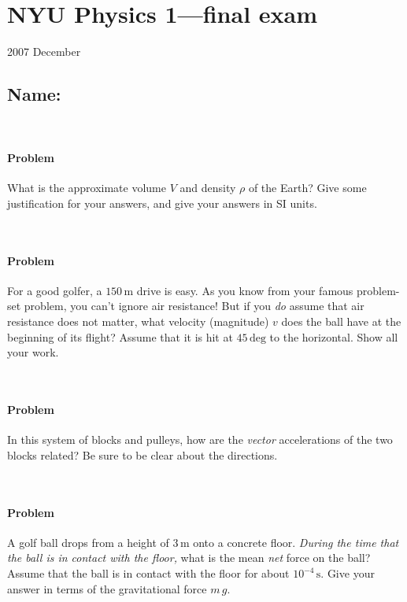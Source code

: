 \documentclass[12pt,letterpaper]{article}
\newcommand{\m}{\mathrm{m}}
\newcommand{\s}{\mathrm{s}}
\renewcommand{\deg}{\mathrm{deg}}
\newcounter{problem}
\begin{document}
\section*{NYU Physics 1---final exam}

2007 December

\subsection*{Name:}

~ \vfill ~

\clearpage

\paragraph{Problem~\theproblem}%
What is the approximate volume $V$ and density $\rho$ of the Earth?
Give some justification for your answers, and give your answers in SI
units.

~ \vfill ~

\paragraph{Problem~\theproblem}%
For a good golfer, a $150\,\m$ drive is easy.  As you know from your
famous problem-set problem, you can't ignore air resistance!  But if
you \emph{do} assume that air resistance does not matter, what
velocity (magnitude) $v$ does the ball have at the beginning of its
flight?  Assume that it is hit at $45\,\deg$ to the horizontal.  Show
all your work.

~ \vfill ~

\clearpage

\paragraph{Problem~\theproblem}%
In this system of blocks and pulleys, how are the \emph{vector}
accelerations of the two blocks related?  Be sure to be clear about
the directions.%
%

~ \vfill ~

\paragraph{Problem~\theproblem}%
A golf ball drops from a height of $3\,\m$ onto a concrete floor.
\emph{During the time that the ball is in contact with the floor,}
what is the mean \emph{net} force on the ball?  Assume that the ball
is in contact with the floor for about $10^{-4}\,\s$.  Give your
answer in terms of the gravitational force $m\,g$.
\end{document}
